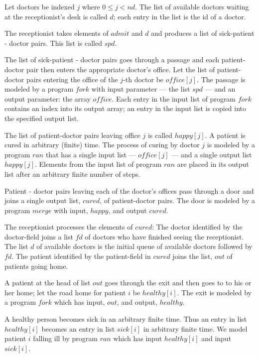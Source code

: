 \vspace{6cm}

Let doctors be indexed $j$ where $0 \leq j < nd$.
The list of available doctors waiting at the receptionist's
desk is called $d$;
each entry in the list is the id of a doctor.

The receptionist takes elements of $admit$ and $d$ and
produces a list of sick-patient - doctor pairs.
This list is called $spd$.

The list of sick-patient - doctor pairs goes through a passage and 
each patient-doctor pair then enters
the appropriate doctor's office.
Let the list of patient-doctor pairs entering the office of the $j$-th doctor be
$office[j]$.
The passage is modeled by a program $fork$ with input parameter ---
the list  $spd$ --- and an output parameter: the array $office$.
Each entry in the input list of program $fork$ contains an index into
its output array; an entry in the input list is copied into the specified
output list.

The list of patient-doctor pairs leaving office $j$ is called $happy[j]$.
A patient is cured in arbitrary (finite) time.
The process of curing by doctor $j$
is modeled by a program $ran$ that has a single
input list --- $office[j]$ --- and a single output list
$happy[j]$. Elements from the input list of program $ran$ are
placed in its output list after an arbitrary finite number of steps.

Patient - doctor pairs leaving each of the doctor's offices pass through
a door and joins a single output list,
$cured$, of patient-doctor pairs.
The door is modeled by a program $merge$ with input, $happy$, and
output $cured$.

The receptionist processes the elements of $cured$: The doctor
identified by the doctor-field joins a list $fd$ of doctors who
have finished seeing the receptionist. The list $d$
of available doctors is the initial queue of available doctors followed by $fd$.
The patient identified by the patient-field in $cured$
 joins the list, $out$ of patients going home.
 
A patient at the head of list $out$ goes through the exit and then goes to
to his or her home; let the road home for patient $i$ be $healthy[i]$.
The exit is modeled by a program $fork$
which has input, $out$, and output, $healthy$.

A healthy person becomes sick in an arbitrary finite time.
Thus an entry in list $healthy[i]$ becomes an entry in list $sick[i]$
in arbitrary finite time.
We model patient $i$ falling ill by program $ran$ which has input
$healthy[i]$ and input $sick[i]$. 

